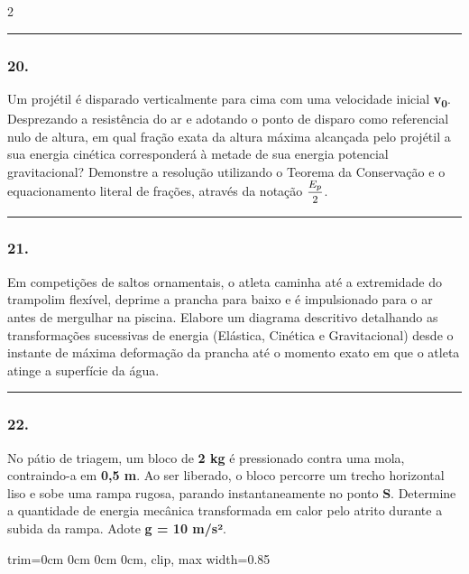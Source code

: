 \documentclass[twoside, 10pt, a4paper]{article}
\newlength{\espacoPreQuestao}\setlength{\espacoPreQuestao}{0.1cm}
\newlength{\espacoQuestao}\setlength{\espacoQuestao}{0.2cm}
\newcommand{\larguraTikz}{0.85\linewidth}
\begin{document}
\begin{multicols*}{2}
\noindent\textcolor{CorLinha}{\rule{\linewidth}{0.5pt}} 
\par\vspace{\espacoPreQuestao}
\subsubsection*{20.} Um projétil é disparado verticalmente para cima com uma velocidade inicial \textbf{v\textsubscript{0}}. Desprezando a resistência do ar e adotando o ponto de disparo como referencial nulo de altura, em qual fração exata da altura máxima alcançada pelo projétil a sua energia cinética corresponderá à metade de sua energia potencial gravitacional? Demonstre a resolução utilizando o Teorema da Conservação e o equacionamento literal de frações, através da notação $ \mfrac{E_p}{2} $.
\par\vspace{\espacoQuestao}
\noindent\textcolor{CorLinha}{\rule{\linewidth}{0.5pt}} 
\par\vspace{\espacoPreQuestao}
\subsubsection*{21.} Em competições de saltos ornamentais, o atleta caminha até a extremidade do trampolim flexível, deprime a prancha para baixo e é impulsionado para o ar antes de mergulhar na piscina. Elabore um diagrama descritivo detalhando as transformações sucessivas de energia (Elástica, Cinética e Gravitacional) desde o instante de máxima deformação da prancha até o momento exato em que o atleta atinge a superfície da água.
\par\vspace{\espacoQuestao}

\noindent\textcolor{CorLinha}{\rule{\linewidth}{0.5pt}} 
\par\vspace{\espacoPreQuestao}
\subsubsection*{22.} No pátio de triagem, um bloco de \textbf{2 kg} é pressionado contra uma mola, contraindo-a em \textbf{0,5 m}. Ao ser liberado, o bloco percorre um trecho horizontal liso e sobe uma rampa rugosa, parando instantaneamente no ponto \textbf{S}. Determine a quantidade de energia mecânica transformada em calor pelo atrito durante a subida da rampa. Adote \textbf{g = 10 m/s²}.
\begin{center}
\begin{adjustbox}{trim=0cm 0cm 0cm 0cm, clip, max width=\larguraTikz}
\end{adjustbox}
\end{center}
\end{multicols*}
\end{document}
